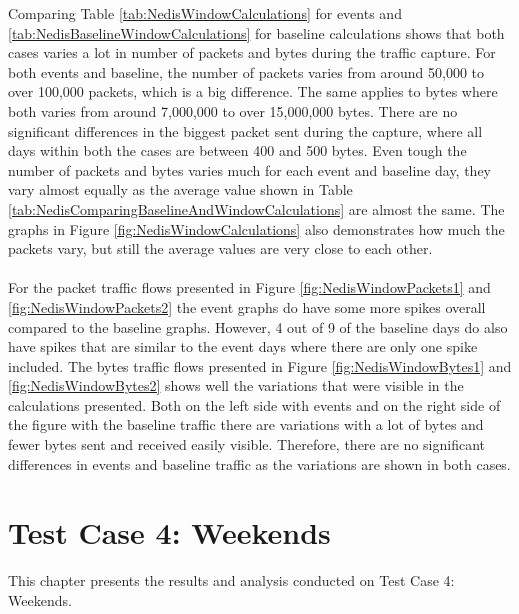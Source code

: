 Comparing Table \ref{tab:NedisWindowCalculations} for events and \ref{tab:NedisBaselineWindowCalculations} for baseline calculations shows that both cases varies a lot in number of packets and bytes during the traffic capture. For both events and baseline, the number of packets varies from around 50,000 to over 100,000 packets, which is a big difference. The same applies to bytes where both varies from around 7,000,000 to over 15,000,000 bytes. There are no significant differences in the biggest packet sent during the capture, where all days within both the cases are between 400 and 500 bytes. Even tough the number of packets and bytes varies much for each event and baseline day, they vary almost equally as the average value shown in Table \ref{tab:NedisComparingBaselineAndWindowCalculations} are almost the same. The graphs in Figure \ref{fig:NedisWindowCalculations} also demonstrates how much the packets vary, but still the average values are very close to each other. 
\\\\
For the packet traffic flows presented in Figure \ref{fig:NedisWindowPackets1} and \ref{fig:NedisWindowPackets2} the event graphs do have some more spikes overall compared to the baseline graphs. However, 4 out of 9 of the baseline days do also have spikes that are similar to the event days where there are only one spike included. The bytes traffic flows presented in Figure \ref{fig:NedisWindowBytes1} and \ref{fig:NedisWindowBytes2} shows well the variations that were visible in the calculations presented. Both on the left side with events and on the right side of the figure with the baseline traffic there are variations with a lot of bytes and fewer bytes sent and received easily visible. Therefore, there are no significant differences in events and baseline traffic as the variations are shown in both cases. 


\newpage
\section{Test Case 4: Weekends}
This chapter presents the results and analysis conducted on Test Case 4: Weekends. 
